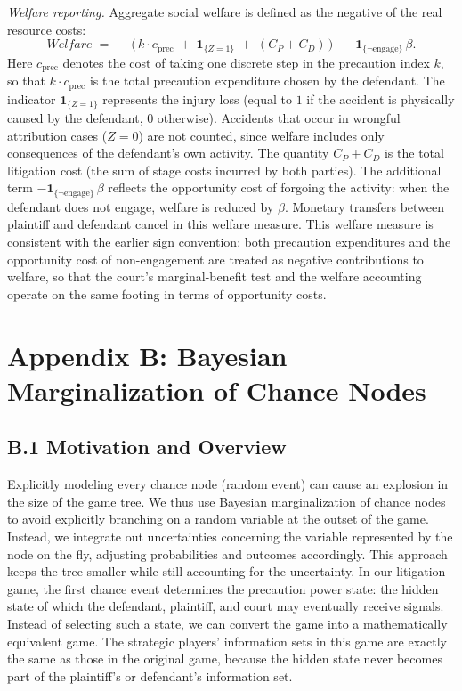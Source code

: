 \documentclass{article}
\begin{document}
\emph{Welfare reporting.} Aggregate social welfare is defined as the negative of the real resource costs:
\[
Welfare \;=\; -\bigl(\,k \cdot c_{\mathrm{prec}} \;+\; \mathbf{1}_{\{Z=1\}} \;+\; (C_P+C_D)\,\bigr)
\;-\;\mathbf{1}_{\{\neg \text{engage}\}}\,\beta.
\]
Here $c_{\mathrm{prec}}$ denotes the cost of taking one discrete step in the precaution index $k$, so that $k \cdot c_{\mathrm{prec}}$ is the total precaution expenditure chosen by the defendant. The indicator $\mathbf{1}_{\{Z=1\}}$ represents the injury loss (equal to $1$ if the accident is physically caused by the defendant, $0$ otherwise). Accidents that occur in wrongful attribution cases ($Z=0$) are not counted, since welfare includes only consequences of the defendant’s own activity. The quantity $C_P+C_D$ is the total litigation cost (the sum of stage costs incurred by both parties). The additional term $-\mathbf{1}_{\{\neg \text{engage}\}}\,\beta$ reflects the opportunity cost of forgoing the activity: when the defendant does not engage, welfare is reduced by $\beta$. Monetary transfers between plaintiff and defendant cancel in this welfare measure. This welfare measure is consistent with the earlier sign convention: both precaution expenditures and the opportunity cost of non-engagement are treated as negative contributions to welfare, so that the court’s marginal-benefit test and the welfare accounting operate on the same footing in terms of opportunity costs.

\section*{Appendix B: Bayesian Marginalization of Chance Nodes}

\subsection*{B.1 Motivation and Overview}

Explicitly modeling every chance node (random event) can cause an explosion in the size of the game tree. We thus use Bayesian marginalization of chance nodes to avoid explicitly branching on a random variable at the outset of the game. Instead, we integrate out uncertainties concerning the variable represented by the node on the fly, adjusting probabilities and outcomes accordingly. This approach keeps the tree smaller while still accounting for the uncertainty. In our litigation game, the first chance event determines the precaution power state: the hidden state of which the defendant, plaintiff, and court may eventually receive signals. Instead of selecting such a state, we can convert the game into a mathematically equivalent game. The strategic players' information sets in this game are exactly the same as those in the original game, because the hidden state never becomes part of the plaintiff's or defendant's information set. 
\end{document}
